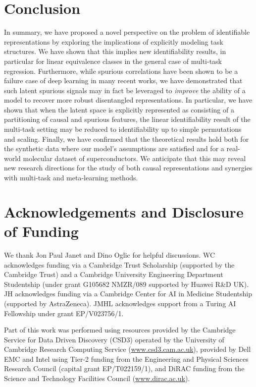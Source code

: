 \documentclass[nohyperref]{article}
\theoremstyle{plain}
\theoremstyle{definition}
\theoremstyle{remark}
\begin{document}
\section{Conclusion}
In summary, we have proposed a novel perspective on the problem of identifiable representations by exploring the implications of explicitly modeling task structures. We have shown that this 
implies new identifiability results, in particular for linear equivalence classes in the general case of multi-task regression. Furthermore, while spurious correlations have been shown to be a
failure case of deep learning in many recent works, we have demonstrated that such latent spurious signals may in fact be leveraged to \textit{improve} the ability of a model to recover more robust disentangled 
representations. In particular, we have shown that when the latent space is explicitly represented as consisting of a partitioning of causal and spurious features, the linear identifiability result
of the multi-task setting may be reduced to identifiability up to simple permutations and scaling. Finally, we have confirmed that the theoretical results hold both for the synthetic data where our model's assumptions are satisfied and for a real-world molecular dataset of superconductors. 
We anticipate that this may reveal new research directions for the study of both causal representations and synergies with 
multi-task and meta-learning methods.

\clearpage

\section*{Acknowledgements and Disclosure of Funding}
We thank Jon Paul Janet and Dino Oglic for helpful discussions. WC acknowledges funding via a Cambridge Trust Scholarship (supported by the Cambridge Trust) and a Cambridge University Engineering Department Studentship (under grant G105682 NMZR/089 supported by Huawei R\&D UK). JH acknowledges funding via a Cambridge Center for AI in Medicine Studentship (supported by AstraZeneca). JMHL acknowledges support from a Turing AI Fellowship under grant EP/V023756/1.

Part of this work was performed using resources provided by the Cambridge Service for Data Driven Discovery (CSD3) operated by the University of Cambridge Research Computing Service (\url{www.csd3.cam.ac.uk}), provided by Dell EMC and Intel using Tier-2 funding from the Engineering and Physical Sciences Research Council (capital grant EP/T022159/1), and DiRAC funding from the Science and Technology Facilities Council (\url{www.dirac.ac.uk}).
\end{document}
